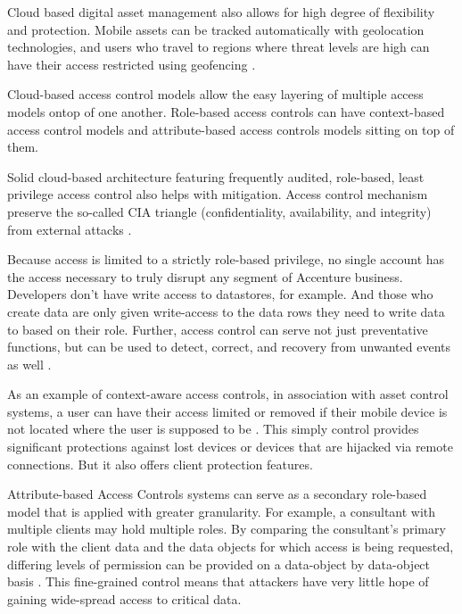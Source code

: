Cloud based digital asset management also allows for high degree of flexibility and protection.  Mobile assets can be tracked automatically with geolocation technologies, and users who travel to regions where threat levels are high can have their access restricted using geofencing \parencite{syndigatemedia10WaysAsset2020}.

Cloud-based access control models allow the easy layering of multiple access models ontop of one another. Role-based access controls can have context-based access control models and attribute-based access controls models sitting on top of them.

Solid cloud-based architecture featuring frequently audited, role-based, least privilege access control also helps with mitigation. Access control mechanism preserve the so-called CIA triangle (confidentiality, availability, and integrity) from external attacks \parencite{malikConventionalStateoftheArtIoT2020}.

Because access is limited to a strictly role-based privilege, no single account has the access necessary to truly disrupt any segment of Accenture business. Developers don't have write access to datastores, for example. And those who create data are only given write-access to the data rows they need to write data to based on their role. Further, access control can serve not just preventative functions, but can be used to detect, correct, and recovery from unwanted events as well \parencite{malikConventionalStateoftheArtIoT2020}.

As an example of context-aware access controls, in association with asset control systems, a user can have their access limited or removed if their mobile device is not located where the user is supposed to be \parencite{jihContextawareAccessControl}. This simply control provides significant protections against lost devices or devices that are hijacked via remote connections. But it also offers client protection features.

Attribute-based Access Controls systems can serve as a secondary role-based model that is applied with greater granularity. For example, a consultant with multiple clients may hold multiple roles. By comparing the consultant's primary role with the client data and the data objects for which access is being requested, differing levels of permission can be provided on a data-object by data-object basis \parencite{huAttributeBasedAccessControl2015}. This fine-grained control means that attackers have very little hope of gaining wide-spread access to critical data.

